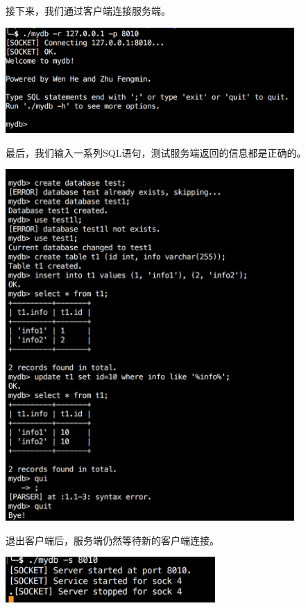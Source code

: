 \documentclass[11pt, a4paper]{article}
\makeatletter
\newcommand\fcaption{\def\@captype{figure}\caption}
\makeatother
\begin{document}
接下来，我们通过客户端连接服务端。

\begin{center}
    \includegraphics[width=11cm]{fig/conn}
    \fcaption{客户端连接服务端}
\end{center}

最后，我们输入一系列SQL语句，测试服务端返回的信息都是正确的。

\begin{center}
    \includegraphics[width=11cm]{fig/conn-test}
    \fcaption{远程操作数据库}
\end{center}

退出客户端后，服务端仍然等待新的客户端连接。

\begin{center}
    \includegraphics[width=8cm]{fig/disconn}
    \fcaption{断开连接}
\end{center}
\end{document}
